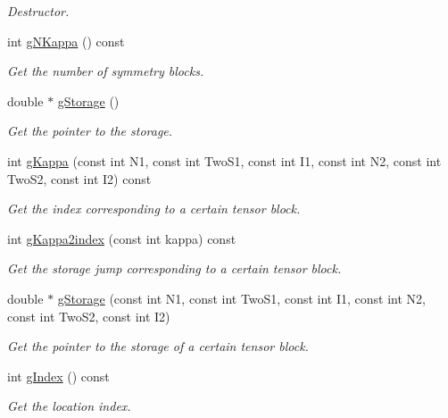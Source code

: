 \begin{DoxyCompactItemize}
\begin{DoxyCompactList}\small\item\em Destructor. \end{DoxyCompactList}\item 
int \hyperlink{classCheMPS2_1_1TensorDiag_a8a92bb9cd8a81fbb0231a6dbfdd92a99}{g\-N\-Kappa} () const 
\begin{DoxyCompactList}\small\item\em Get the number of symmetry blocks. \end{DoxyCompactList}\item 
double $\ast$ \hyperlink{classCheMPS2_1_1TensorDiag_a7fb7bbec47e601be89ffba3ad3736ca7}{g\-Storage} ()
\begin{DoxyCompactList}\small\item\em Get the pointer to the storage. \end{DoxyCompactList}\item 
int \hyperlink{classCheMPS2_1_1TensorDiag_afe58c4ad11406778d2db5ae9605f9953}{g\-Kappa} (const int N1, const int Two\-S1, const int I1, const int N2, const int Two\-S2, const int I2) const 
\begin{DoxyCompactList}\small\item\em Get the index corresponding to a certain tensor block. \end{DoxyCompactList}\item 
int \hyperlink{classCheMPS2_1_1TensorDiag_a294cca82527b6893a80e47336edf1952}{g\-Kappa2index} (const int kappa) const 
\begin{DoxyCompactList}\small\item\em Get the storage jump corresponding to a certain tensor block. \end{DoxyCompactList}\item 
double $\ast$ \hyperlink{classCheMPS2_1_1TensorDiag_af06189fc46ecd5836b53dbd265ba75fd}{g\-Storage} (const int N1, const int Two\-S1, const int I1, const int N2, const int Two\-S2, const int I2)
\begin{DoxyCompactList}\small\item\em Get the pointer to the storage of a certain tensor block. \end{DoxyCompactList}\item 
int \hyperlink{classCheMPS2_1_1TensorDiag_a1902295ffebe5ce6d10291756a784d27}{g\-Index} () const 
\begin{DoxyCompactList}\small\item\em Get the location index. \end{DoxyCompactList}\end{DoxyCompactItemize}
